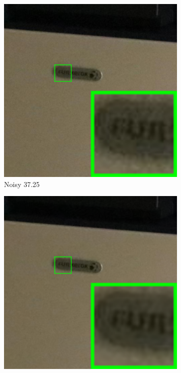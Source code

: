 \begin{figure}
    \centering
    \begin{subfigure}[t]{0.19\textwidth}
        \centering
        \includegraphics[width=1\textwidth]{images/guided/our/resize_br_Noisy_Canon_80D_ISO12800_IMG_2360_part10.png}
		\caption{Noisy 37.25}
    \end{subfigure}
    \hfill
    \begin{subfigure}[t]{0.19\textwidth}
        \centering
        \includegraphics[width=1\textwidth]{images/guided/our/resize_br_CBM3D_Canon_80D_ISO12800_IMG_2360_part10.png}

\end{subfigure}
\end{figure}
